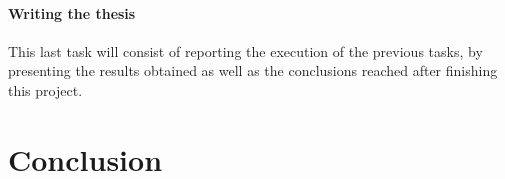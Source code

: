\documentclass[runningheads]{llncs}
\begin{document}
\paragraph{Writing the thesis}
This last task will consist of reporting the execution of the previous tasks, by presenting the results obtained as well as the conclusions reached after finishing this project.




\section{Conclusion}
\label{sec:Conclusion}


%
%

%
%
%
% 
% 
%


\end{document}
